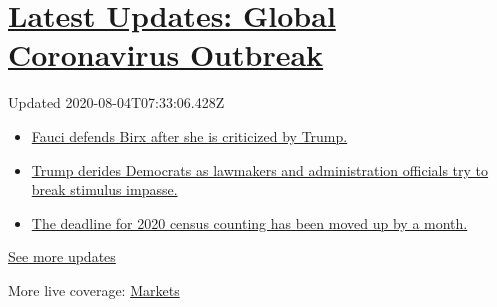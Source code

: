 \hypertarget{latest-updates-global-coronavirus-outbreak}{%
\section{\texorpdfstring{\href{https://www.nytimes3xbfgragh.onion/2020/08/03/world/coronavirus-covid-19.html?action=click\&pgtype=Article\&state=default\&region=MAIN_CONTENT_1\&context=storylines_live_updates}{Latest
Updates: Global Coronavirus
Outbreak}}{Latest Updates: Global Coronavirus Outbreak}}\label{latest-updates-global-coronavirus-outbreak}}

Updated 2020-08-04T07:33:06.428Z

\begin{itemize}
\tightlist
\item
  \href{https://www.nytimes3xbfgragh.onion/2020/08/03/world/coronavirus-covid-19.html?action=click\&pgtype=Article\&state=default\&region=MAIN_CONTENT_1\&context=storylines_live_updates\#link-4547638f}{Fauci
  defends Birx after she is criticized by Trump.}
\item
  \href{https://www.nytimes3xbfgragh.onion/2020/08/03/world/coronavirus-covid-19.html?action=click\&pgtype=Article\&state=default\&region=MAIN_CONTENT_1\&context=storylines_live_updates\#link-15e7f995}{Trump
  derides Democrats as lawmakers and administration officials try to
  break stimulus impasse.}
\item
  \href{https://www.nytimes3xbfgragh.onion/2020/08/03/world/coronavirus-covid-19.html?action=click\&pgtype=Article\&state=default\&region=MAIN_CONTENT_1\&context=storylines_live_updates\#link-e5a2cda}{The
  deadline for 2020 census counting has been moved up by a month.}
\end{itemize}

\href{https://www.nytimes3xbfgragh.onion/2020/08/03/world/coronavirus-covid-19.html?action=click\&pgtype=Article\&state=default\&region=MAIN_CONTENT_1\&context=storylines_live_updates}{See
more updates}

More live coverage:
\href{https://www.nytimes3xbfgragh.onion/live/2020/08/03/business/stock-market-today-coronavirus?action=click\&pgtype=Article\&state=default\&region=MAIN_CONTENT_1\&context=storylines_live_updates}{Markets}

